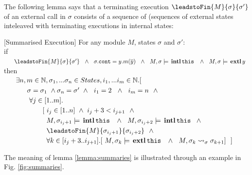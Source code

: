  The following lemma says that a terminating execution $\leadstoFin {M} {\sigma} {\sigma'}$ of an external call in $\sigma$ consists of a sequence of (sequences of external states inteleaved with terminating executions in internal states:
 
\begin{lemma}
\label{lemma:external_breakdown}[Summarised Execution]
For any module $M$,  states $\sigma$ and $\sigma'$:
\\
if \\
$\strut \ \ \ \ \ \leadstoFin {M} {\sigma} {\sigma'}  \ \ \wedge\ \ \sigma.\texttt{cont} = y.m(\overline y) \ \ \wedge  \ \ M,\sigma \models \internal {\texttt{this}}\ \ \wedge \ \ M,\sigma \models \external y\ $
\\
then
\\
$\strut \ \ \ \ \ \exists n,m\in \mathbb{N}, \sigma_1, ... \sigma_n \in States, i_1,...i_m \in \mathbb{N}. [$\\
$\strut \ \ \ \ \ \ \ \ \ \ \sigma=\sigma_1  \ \wedge  \sigma_n=\sigma'\ \wedge\ \  i_1=2 \ \ \wedge\ \   i_m=n\ \ \wedge$\\
$\strut \ \ \ \ \ \ \ \ \ \ \ \forall j\in [1..m].$\\
$\strut \ \ \ \ \ \ \ \ \ \ \hspace{.8cm}[ \ i_j \in [1..n]\  \wedge \ i_{j}+3  < i_{j+1} \ \ \wedge$\\
$\strut \ \ \ \ \ \ \ \ \ \ \hspace{1cm} M, \sigma_{i_j+1} \models \internal {\texttt{this}}  \ \ \wedge \ \ M, \sigma_{i_j+2} \models \internal {\texttt{this}}  \ \ \wedge$\\
$\strut \ \ \ \ \ \ \ \ \ \ \hspace{1cm}  \leadstoFin {M} {\sigma_{i_j+1}} {\sigma_{i_j+2}}\ \ \wedge $\\
$\strut \ \ \ \ \ \ \ \ \ \ \hspace{1cm} \forall k\in [i_j+3..i_{j+1}]. [\ M, \sigma_k \models {\ensuremath{\, \mathbf{extl}}\, \texttt{this}\, }  \ \ \wedge \ \ M, \sigma_{k} \leadsto_{\sigma} \sigma_{k+1}] \ \ ]$
\end{lemma}

The meaning of lemma \ref{lemma:summaries} is illustrated through an example in Fig. \ref{fig:summaries}.

